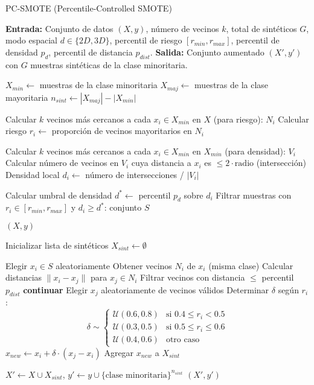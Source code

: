 \begin{algorithm}
\caption{PC-SMOTE (Percentile-Controlled SMOTE)}
\begin{algorithmic}[1]
\State \textbf{Entrada:} Conjunto de datos $(X, y)$, número de vecinos $k$, total de sintéticos $G$, modo espacial $d \in \{2D, 3D\}$, percentil de riesgo $[r_{min}, r_{max}]$, percentil de densidad $p_d$, percentil de distancia $p_{dist}$.
\State \textbf{Salida:} Conjunto aumentado $(X', y')$ con $G$ muestras sintéticas de la clase minoritaria.

\State $X_{min} \gets$ muestras de la clase minoritaria
\State $X_{maj} \gets$ muestras de la clase mayoritaria
\State $n_{sint} \gets |X_{maj}| - |X_{min}|$

\State Calcular $k$ vecinos más cercanos a cada $x_i \in X_{min}$ en $X$ (para riesgo): $N_i$
\State Calcular riesgo $r_i \gets$ proporción de vecinos mayoritarios en $N_i$

\State Calcular $k$ vecinos más cercanos a cada $x_i \in X_{min}$ en $X_{min}$ (para densidad): $V_i$
    \State Calcular número de vecinos en $V_i$ cuya distancia a $x_i$ es $\leq 2 \cdot \text{radio}$ (intersección)
    \State Densidad local $d_i \gets$ número de intersecciones / $|V_i|$
\EndFor

\State Calcular umbral de densidad $d^* \gets$ percentil $p_d$ sobre $d_i$
\State Filtrar muestras con $r_i \in [r_{min}, r_{max}]$ y $d_i \geq d^*$: conjunto $S$

    \State \Return $(X, y)$ 
\EndIf

\State Inicializar lista de sintéticos $X_{sint} \gets \emptyset$

    \State Elegir $x_i \in S$ aleatoriamente
    \State Obtener vecinos $N_i$ de $x_i$ (misma clase)
    \State Calcular distancias $\|x_i - x_j\|$ para $x_j \in N_i$
    \State Filtrar vecinos con distancia $\leq$ percentil $p_{dist}$
        \State \textbf{continuar}
    \EndIf
    \State Elegir $x_j$ aleatoriamente de vecinos válidos
    \State Determinar $\delta$ según $r_i$:
        \[
        \delta \sim 
        \begin{cases}
            \mathcal{U}(0.6, 0.8) & \text{si } 0.4 \leq r_i < 0.5 \\
            \mathcal{U}(0.3, 0.5) & \text{si } 0.5 \leq r_i \leq 0.6 \\
            \mathcal{U}(0.4, 0.6) & \text{otro caso}
        \end{cases}
        \]
    \State $x_{new} \gets x_i + \delta \cdot (x_j - x_i)$
    \State Agregar $x_{new}$ a $X_{sint}$
\EndWhile

\State $X' \gets X \cup X_{sint}$, $y' \gets y \cup \{\text{clase minoritaria}\}^{n_{sint}}$
\State \Return $(X', y')$

\end{algorithmic}
\end{algorithm}


